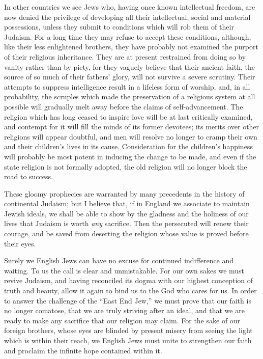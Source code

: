 In other countries we see Jews who, having once known 
intellectual freedom, are now denied the privilege of 
developing all their intellectual, social and material possessions, unless they submit to conditions which will 
rob them of their Judaism. For a long time they may 
refuse to accept these conditions, although, like their 
less enlightened brothers, they have probably not examined the purport of their religious inheritance. They 
are at present restrained from doing so by vanity rather 
than by piety, for they vaguely believe that their ancient 
faith, the source of so much of their fathers' glory, will not 
survive a severe scrutiny. Their attempts to suppress 
intelligence result in a lifeless form of worship, and, in all 
probability, the scruples which made the preservation of a 
religious system at all possible will gradually melt away 
before the claims of self-advancement. The religion which 
has long ceased to inspire love will be at last critically 
examined, and contempt for it will fill the minds of its 
former devotees; its merits over other religions will 
appear doubtful, and men will resolve no longer to cramp 
their own and their children's lives in its cause. Consideration for the children's happiness will probably be 
most potent in inducing the change to be made, and even if 
the state religion is not formally adopted, the old religion 
will no longer block the road to success. 

These gloomy prophecies are warranted by many precedents in the
history of continental Judaism; but I 
believe that, if in England we associate to maintain Jewish 
ideals, we shall be able to show by the gladness and the 
holiness of our lives that Judaism is worth \textsl{any} sacrifice. 
Then the persecuted will renew their courage, and be saved 
from deserting the religion whose value is proved before 
their eyes. 

Surely we English Jews can have no excuse for continued
indifference and waiting. To us the call is clear 
and unmistakable. For our own sakes we must revive 
Judaism, and having reconciled its dogma with our highest 
conception of truth and beauty, allow it again to bind us 
to the God who cares for us. In order to answer the 
challenge of the ``East End Jew,'' we must prove that our 
faith is no longer comatose, that we are truly striving 
after an ideal, and that we are ready to make any sacrifice 
that our religion may claim. For the sake of our foreign 
brothers, whose eyes are blinded by present misery from 
seeing the light which is within their reach, we English 
Jews must unite to strengthen our faith and proclaim the 
infinite hope contained within it. 

